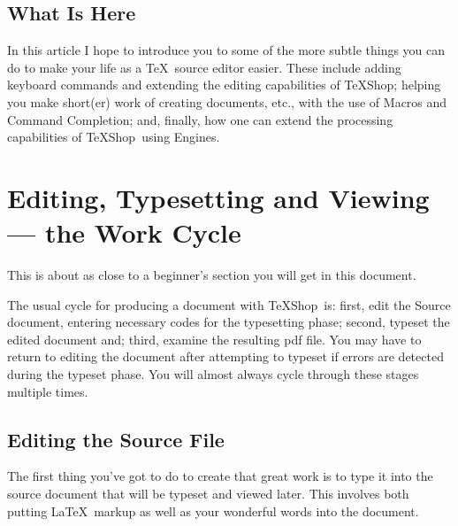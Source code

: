 \documentclass[letterpaper,11pt]{article}
\newcommand{\TS}{\textsf{\TeX Shop}}
\newcommand{\cmd}[1]{\textsf{#1}}
\begin{document}
\subsection{What Is Here}

In this article I hope to introduce you to some of the more subtle things you can do to make your life as a \TeX\ source editor easier. These include adding keyboard commands and extending the editing capabilities of \TS; helping you make short(er) work of creating documents, etc., with the use of Macros and Command Completion; and, finally, how one can extend the processing capabilities of \TS\ using Engines.

\section{Editing, Typesetting and Viewing --- the Work Cycle}

This is about as close to a beginner's section you will get in this document.

The usual cycle for producing a document with \TS\ is: first, edit the Source document, entering necessary codes for the typesetting phase; second, typeset the edited document and; third, examine the resulting \cmd{pdf} file. You may have to return to editing the document after attempting to typeset if errors are detected during the typeset phase. You will almost always cycle through these stages multiple times.

\subsection{Editing the Source File}

The first thing you've got to do to create that great work is to type it into the source document that will be typeset and viewed later. This involves both putting \LaTeX\ markup as well as your wonderful words into the document.
\end{document}
